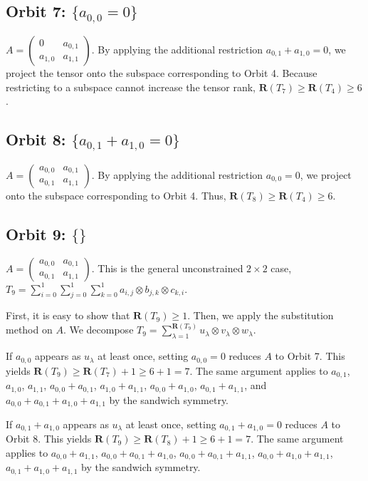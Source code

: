 \documentclass[11pt]{article}
\begin{document}
\subsection*{Orbit 7: $\{a_{0,0}=0\}$}
$A=
  \begin{pmatrix}
    0       & a_{0,1} \\
    a_{1,0} & a_{1,1}
  \end{pmatrix}$.
By applying the additional restriction $a_{0,1}+a_{1,0}=0$, we project the tensor onto the subspace corresponding to Orbit 4. Because restricting to a subspace cannot increase the tensor rank, $\mathbf{R} (T_7) \geq \mathbf{R} (T_4) \geq 6$.

\subsection*{Orbit 8: $\{a_{0,1}+a_{1,0}=0\}$}
$A=
  \begin{pmatrix}
    a_{0,0} & a_{0,1} \\
    a_{0,1} & a_{1,1}
  \end{pmatrix}$.
By applying the additional restriction $a_{0,0}=0$, we project onto the subspace corresponding to Orbit 4. Thus, $\mathbf{R} (T_8) \geq \mathbf{R} (T_4) \geq 6$.

\subsection*{Orbit 9: $\{\}$}
$A=
  \begin{pmatrix}
    a_{0,0} & a_{0,1} \\
    a_{0,1} & a_{1,1}
  \end{pmatrix}$.
This is the general unconstrained $2\times 2$ case, $T_9 = \sum_{i=0}^{1}\sum_{j=0}^{1}\sum_{k=0}^{1} a_{i,j}\otimes b_{j,k}\otimes c_{k,i}$.

First, it is easy to show that $\mathbf{R} (T_9) \geq 1$. Then, we apply the substitution method on $A$.
We decompose $T_9 = \sum_{\lambda=1}^{\mathbf{R} (T_9)} u_\lambda \otimes v_\lambda \otimes w_\lambda$.

If $a_{0,0}$ appears as $u_\lambda$ at least once, setting $a_{0,0}=0$ reduces $A$ to Orbit 7.
This yields $\mathbf{R} (T_9) \geq \mathbf{R} (T_7)+1 \geq 6+1=7$.
The same argument applies to $a_{0,1}$, $a_{1,0}$, $a_{1,1}$, $a_{0,0}+a_{0,1}$, $a_{1,0}+a_{1,1}$, $a_{0,0}+a_{1,0}$, $a_{0,1}+a_{1,1}$, and $a_{0,0}+a_{0,1}+a_{1,0}+a_{1,1}$ by the sandwich symmetry.

If $a_{0,1}+a_{1,0}$ appears as $u_\lambda$ at least once, setting $a_{0,1}+a_{1,0}=0$ reduces $A$ to Orbit 8.
This yields $\mathbf{R} (T_9) \geq \mathbf{R} (T_8)+1 \geq 6+1=7$.
The same argument applies to $a_{0,0}+a_{1,1}$, $a_{0,0}+a_{0,1}+a_{1,0}$, $a_{0,0}+a_{0,1}+a_{1,1}$, $a_{0,0}+a_{1,0}+a_{1,1}$, $a_{0,1}+a_{1,0}+a_{1,1}$ by the sandwich symmetry.
\end{document}
